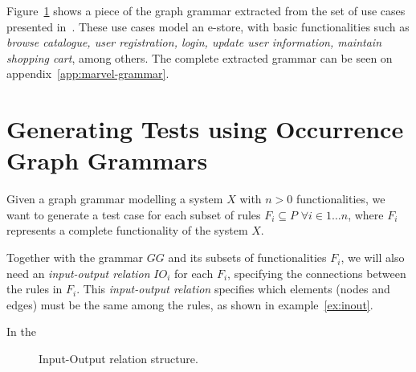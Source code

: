 Figure~\ref{} shows a piece of the graph grammar extracted from the set of use cases presented in~\cite{Goins2007}. These use cases model an e-store, with basic functionalities such as \emph{browse catalogue, user registration, login, update user information, maintain shopping cart}, among others. The complete extracted grammar can be seen on appendix~\ref{app:marvel-grammar}.

\section{Generating Tests using Occurrence Graph Grammars}

Given a graph grammar \graphGrammar{} modelling a system $X$ with $n > 0$ functionalities, we want to generate a test case for each subset of rules $F_i \subseteq P$ $\forall i \in 1\ldots n$, where $F_i$ represents a complete functionality  of the system $X$.

Together with the grammar $GG$ and its subsets of functionalities $F_i$, we will also need an \emph{input-output relation} $IO_i$ for each $F_i$, specifying the connections between the rules in $F_i$. This \emph{input-output relation} specifies which elements (nodes and edges) must be the same among the rules, as shown in example~\ref{ex:inout}.

\begin{example}\label{ex:inout} In the


\begin{figure}[!ht]
  \centering
  \caption{Input-Output relation structure.}\label{fig:tests:inout}
\end{figure}

\end{example}

